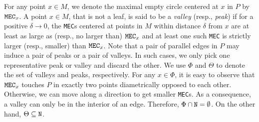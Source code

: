 \documentclass[12pt]{llncs}
\begin{document}
For any point $x\in M$, we denote the maximal empty circle centered at $x$ in $P$ 
by ${\tt MEC}_x$.
A point $x \in M$, that is not a leaf, is said to be a {\it
valley} (resp., {\it peak}) if for a positive $\delta \to 0$, the {\tt MEC}s
centered at points in $M$ within  distance $\delta$ from $x$ are at
least as large as (resp., no larger than) ${\tt MEC}_x$ and at least 
one such {\tt MEC} is strictly larger (resp., smaller) than $
{\tt MEC}_x$. Note that a pair of parallel edges in $P$ may induce a pair of peaks or a pair of 
valleys. In such cases, we only pick one representative peak or valley and discard the 
other. We use $\Phi$ and $\Theta$ to denote the set of valleys and 
peaks, 
respectively.  For any $x \in \Phi$, it is easy to observe that ${\tt MEC}_x$ touches $P
$ in exactly two points diametrically opposed to each other. Otherwise, we can move along a direction to get smaller {\tt MEC}s. 
 As a consequence, a valley can only be in the interior of an edge.
Therefore, $\Phi \cap {\tt 
N} = 
\emptyset$. On the other hand, $\Theta \subseteq {\tt N}$. 
\end{document}
